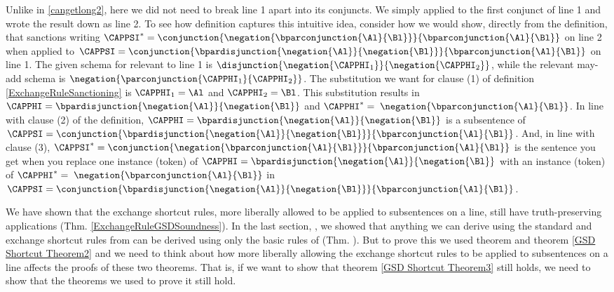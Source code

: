 Unlike in \ref{cangetlong2}, here we did not need to break line 1 apart into its conjuncts. We simply applied  to the first conjunct of line 1 and wrote the result down as line 2. To see how definition  captures this intuitive idea, consider how we would show, directly from the definition, that  sanctions writing $\CAPPSI^*=\conjunction{\negation{\bparconjunction{\Al}{\Bl}}}{\bparconjunction{\Al}{\Bl}}$ on line 2 when applied to $\CAPPSI=\conjunction{\bpardisjunction{\negation{\Al}}{\negation{\Bl}}}{\bparconjunction{\Al}{\Bl}}$ on line 1. The given schema for  relevant to line 1 is $\disjunction{\negation{\CAPPHI_1}}{\negation{\CAPPHI_2}}$, while the relevant may-add schema is $\negation{\parconjunction{\CAPPHI_1}{\CAPPHI_2}}$. The substitution we want for clause (1) of definition \ref{ExchangeRuleSanctioning} is $\CAPPHI_1=\Al$ and $\CAPPHI_2=\Bl$. This substitution results in $\CAPPHI=\bpardisjunction{\negation{\Al}}{\negation{\Bl}}$ and $\CAPPHI^*=\;\negation{\bparconjunction{\Al}{\Bl}}$. In line with clause (2) of the definition, $\CAPPHI=\bpardisjunction{\negation{\Al}}{\negation{\Bl}}$ is a subsentence of $\CAPPSI=\conjunction{\bpardisjunction{\negation{\Al}}{\negation{\Bl}}}{\bparconjunction{\Al}{\Bl}}$. And, in line with clause (3), $\CAPPSI^*=\conjunction{\negation{\bparconjunction{\Al}{\Bl}}}{\bparconjunction{\Al}{\Bl}}$ is the \GSL{} sentence you get when you replace one instance (token) of $\CAPPHI=\bpardisjunction{\negation{\Al}}{\negation{\Bl}}$ with an instance (token) of $\CAPPHI^*=\;\negation{\bparconjunction{\Al}{\Bl}}$ in $\CAPPSI=\conjunction{\bpardisjunction{\negation{\Al}}{\negation{\Bl}}}{\bparconjunction{\Al}{\Bl}}$.

\bigskip
\noindent{}We have shown that the exchange shortcut rules, more liberally allowed to be applied to subsentences on a line, still have truth-preserving applications (Thm. \ref{ExchangeRuleGSDSoundness}).
In the last section, , we showed that anything we can derive using the standard and exchange shortcut rules from \GSDP{} can be derived using only the basic rules of \GSD{} (Thm. ). 
But to prove this we used theorem  and theorem \ref{GSD Shortcut Theorem2} and we need to think about how more liberally allowing the exchange shortcut rules to be applied to subsentences on a line affects the proofs of these two theorems. 
That is, if we want to show that theorem \ref{GSD Shortcut Theorem3} still holds, we need to show that the theorems we used to prove it still hold.

